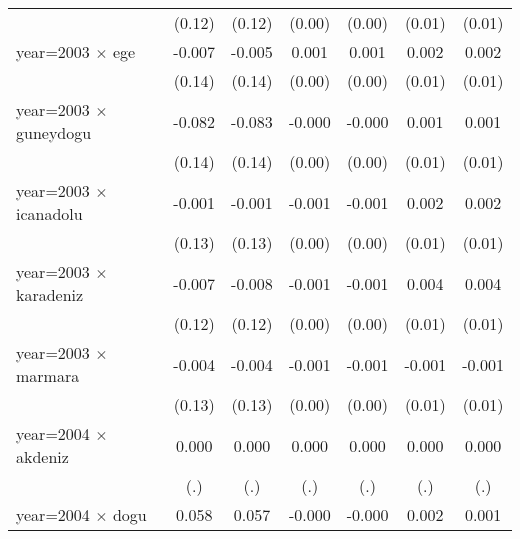 {\begin{tabular}{l*{6}{c}}
                    &      (0.12)         &      (0.12)         &      (0.00)         &      (0.00)         &      (0.01)         &      (0.01)         \\
year=2003 $\times$ ege&      -0.007         &      -0.005         &       0.001         &       0.001         &       0.002         &       0.002         \\
                    &      (0.14)         &      (0.14)         &      (0.00)         &      (0.00)         &      (0.01)         &      (0.01)         \\
year=2003 $\times$ guneydogu&      -0.082         &      -0.083         &      -0.000         &      -0.000         &       0.001         &       0.001         \\
                    &      (0.14)         &      (0.14)         &      (0.00)         &      (0.00)         &      (0.01)         &      (0.01)         \\
year=2003 $\times$ icanadolu&      -0.001         &      -0.001         &      -0.001         &      -0.001         &       0.002         &       0.002         \\
                    &      (0.13)         &      (0.13)         &      (0.00)         &      (0.00)         &      (0.01)         &      (0.01)         \\
year=2003 $\times$ karadeniz&      -0.007         &      -0.008         &      -0.001         &      -0.001         &       0.004         &       0.004         \\
                    &      (0.12)         &      (0.12)         &      (0.00)         &      (0.00)         &      (0.01)         &      (0.01)         \\
year=2003 $\times$ marmara&      -0.004         &      -0.004         &      -0.001         &      -0.001         &      -0.001         &      -0.001         \\
                    &      (0.13)         &      (0.13)         &      (0.00)         &      (0.00)         &      (0.01)         &      (0.01)         \\
year=2004 $\times$ akdeniz&       0.000         &       0.000         &       0.000         &       0.000         &       0.000         &       0.000         \\
                    &         (.)         &         (.)         &         (.)         &         (.)         &         (.)         &         (.)         \\
year=2004 $\times$ dogu&       0.058         &       0.057         &      -0.000         &      -0.000         &       0.002         &       0.001         \\

\end{tabular}}
